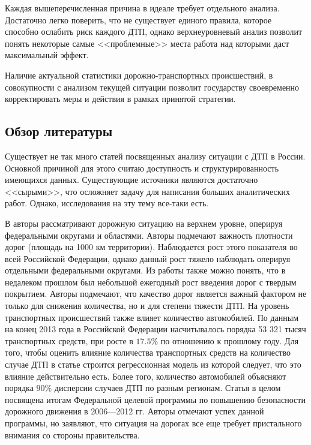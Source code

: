 \documentclass[a4paper, 14pt]{article}
\begin{document}
Каждая вышеперечисленная причина в идеале требует отдельного анализа. Достаточно легко поверить, что не существует единого правила, которое способно ослабить риск каждого ДТП, однако верхнеуровневый анализ позволит понять некоторые самые <<проблемные>> места работа над которыми даст максимальный эффект.

Наличие актуальной статистики дорожно-транспортных происшествий, в совокупности с анализом текущей ситуации позволит государству своевременно корректировать меры и действия в рамках принятой стратегии. 

\subsection{Обзор литературы}
Существует не так много статей посвященных анализу ситуации с ДТП в России. Основной причиной для этого считаю доступность и структурированность имеющихся данных. Существующие источники являются достаточно <<сырыми>>, что осложняет задачу для написания больших аналитических работ. Однако, исследования на эту тему все-таки есть.

В \cite{ivliev_econ_stat_analysis} авторы рассматривают дорожную ситуацию на верхнем уровне, оперируя федеральными округами и областями. Авторы подмечают важность плотности дорог (площадь на 1000 км территории). Наблюдается рост этого показателя во всей Российской Федерации, однако данный рост тяжело наблюдать оперируя отдельными федеральными округами. Из работы также можно понять, что в недалеком прошлом был небольшой ежегодный рост введения дорог с твердым покрытием. Авторы подмечают, что качество дорог является важный фактором не только для снижения количества, но и для степени тяжести ДТП. На уровень транспортных происшествий также влияет количество автомобилей. По данным на конец 2013 года в Российской Федерации насчитывалось порядка 53 321 тысяч транспортных средств, при росте в $17.5\%$ по отношению к прошлому году. Для того, чтобы оценить влияние количества транспортных средств на количество случае ДТП в статье строится регрессионная модель из которой следует, что это влияние действительно есть. Более того, количество автомобилей объясняют порядка $90\%$ дисперсии случаев ДТП по разным регионам. Статья в целом посвящена итогам Федеральной целевой программы по повышению безопасности дорожного движения в 2006---2012 гг. Авторы отмечают успех данной программы, но заявляют, что ситуация на дорогах все еще требует пристального внимания со стороны правительства.
\end{document}
